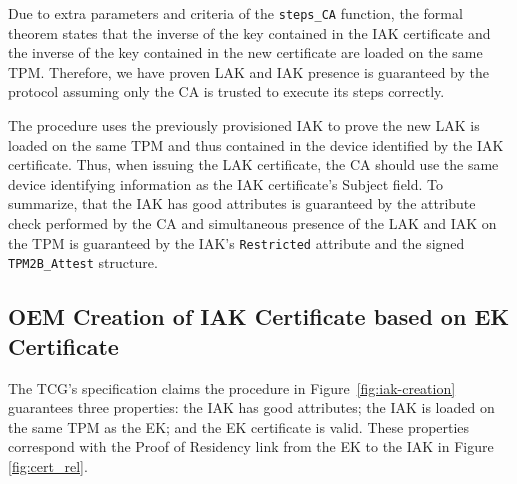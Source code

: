 \documentclass[runningheads]{llncs}
\begin{document}
Due to extra parameters and criteria of the \verb|steps_CA| function,
the formal theorem states that the inverse of the key contained in the
IAK certificate and the inverse of the key contained in the new
certificate are loaded on the same TPM.  Therefore, we have proven LAK
and IAK presence is guaranteed by the protocol assuming only the CA is
trusted to execute its steps correctly.

The procedure uses the previously provisioned IAK to prove the new LAK
is loaded on the same TPM and thus contained in the device identified
by the IAK certificate. Thus, when issuing the LAK certificate, the CA
should use the same device identifying information as the IAK
certificate's Subject field. To summarize, that the IAK has good
attributes is guaranteed by the attribute check performed by the CA
and simultaneous presence of the LAK and IAK on the TPM is guaranteed
by the IAK's \verb|Restricted| attribute and the signed
\verb|TPM2B_Attest| structure.

\subsection{OEM Creation of IAK Certificate based on EK Certificate}

The TCG's specification claims the procedure in
Figure~\ref{fig:iak-creation} guarantees three properties: the IAK
has good attributes; the IAK is loaded on the same TPM as the EK; and
the EK certificate is valid. These properties correspond with the
Proof of Residency link from the EK to the IAK in Figure
\ref{fig:cert_rel}.
\end{document}
